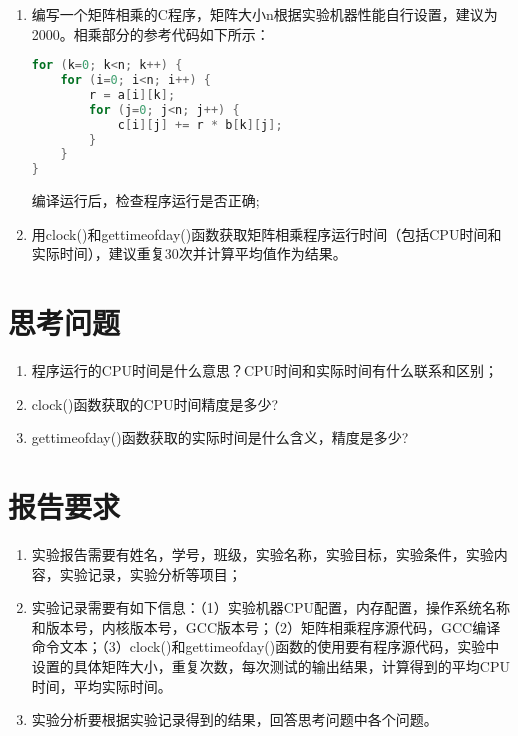 \begin{enumerate}
	\item 编写一个矩阵相乘的C程序，矩阵大小n根据实验机器性能自行设置，建议为2000。相乘部分的参考代码如下所示：
\begin{lstlisting}[language={C++}]
for (k=0; k<n; k++) {
    for (i=0; i<n; i++) {
    	r = a[i][k];
    	for (j=0; j<n; j++) {
    		c[i][j] += r * b[k][j];
    	}
    }
}
\end{lstlisting}
编译运行后，检查程序运行是否正确;
	\item 用clock()和gettimeofday()函数获取矩阵相乘程序运行时间（包括CPU时间和实际时间），建议重复30次并计算平均值作为结果。
\end{enumerate}

\section{思考问题}

\begin{enumerate}
	\item 程序运行的CPU时间是什么意思？CPU时间和实际时间有什么联系和区别；
	\item clock()函数获取的CPU时间精度是多少?
	\item gettimeofday()函数获取的实际时间是什么含义，精度是多少?
\end{enumerate}

\section{报告要求}

\begin{enumerate}
	\item 实验报告需要有姓名，学号，班级，实验名称，实验目标，实验条件，实验内容，实验记录，实验分析等项目；
	\item 实验记录需要有如下信息：（1）实验机器CPU配置，内存配置，操作系统名称和版本号，内核版本号，GCC版本号；（2）矩阵相乘程序源代码，GCC编译命令文本；（3）clock()和gettimeofday()函数的使用要有程序源代码，实验中设置的具体矩阵大小，重复次数，每次测试的输出结果，计算得到的平均CPU时间，平均实际时间。
	\item 实验分析要根据实验记录得到的结果，回答思考问题中各个问题。
\end{enumerate}

